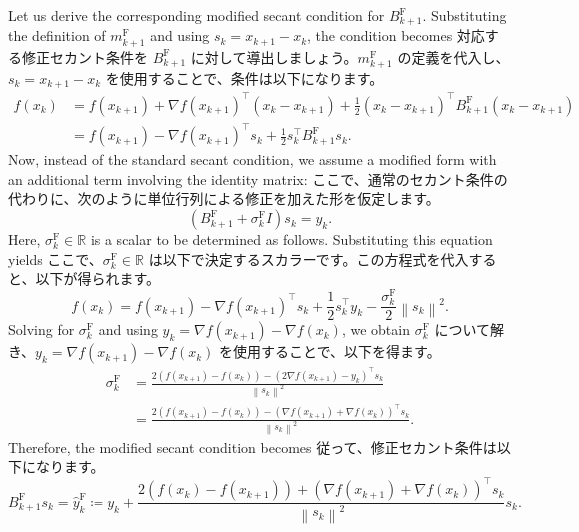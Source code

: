 \documentclass[0_main]{subfiles}
\begin{document}
\ifEn
    Let us derive the corresponding modified secant condition for $B_{k+1}^{\mathrm{F}}$. Substituting the definition of $m_{k+1}^{\mathrm{F}}$ and using $s_k = x_{k+1} - x_k$, the condition becomes
\else
    対応する修正セカント条件を $B_{k+1}^{\mathrm{F}}$ に対して導出しましょう。$m_{k+1}^{\mathrm{F}}$ の定義を代入し、$s_k = x_{k+1} - x_k$ を使用することで、条件は以下になります。
\fi
\begin{align*}
    f(x_k) & = f(x_{k+1}) + \nabla f(x_{k+1})^\top (x_k - x_{k+1}) + \frac{1}{2} (x_k - x_{k+1})^\top B_{k+1}^{\mathrm{F}} (x_k - x_{k+1}) \\
           & = f(x_{k+1}) - \nabla f(x_{k+1})^\top s_k + \frac{1}{2} s_k^\top B_{k+1}^{\mathrm{F}} s_k.
\end{align*}
\ifEn
    Now, instead of the standard secant condition, we assume a modified form with an additional term involving the identity matrix:
\else
    ここで、通常のセカント条件の代わりに、次のように単位行列による修正を加えた形を仮定します。
\fi
\begin{equation*}
    \left(B_{k+1}^{\mathrm{F}} + \sigma_k^\mathrm{F} I \right) s_k = y_k.
\end{equation*}
\ifEn
    Here, $\sigma_k^\mathrm{F} \in \mathbb{R}$ is a scalar to be determined as follows. Substituting this equation yields
\else
    ここで、$\sigma_k^\mathrm{F} \in \mathbb{R}$ は以下で決定するスカラーです。この方程式を代入すると、以下が得られます。
\fi
\begin{equation*}
    f(x_k) = f(x_{k+1}) - \nabla f(x_{k+1})^\top s_k + \frac{1}{2} s_k^\top y_k - \frac{\sigma_k^\mathrm{F}}{2} \left\lVert s_k \right\rVert^2.
\end{equation*}
\ifEn
    Solving for $\sigma_k^\mathrm{F}$ and using $y_k = \nabla f(x_{k+1}) - \nabla f(x_k)$, we obtain
\else
    $\sigma_k^\mathrm{F}$ について解き、$y_k = \nabla f(x_{k+1}) - \nabla f(x_k)$ を使用することで、以下を得ます。
\fi
\begin{align*}
    \sigma_k^\mathrm{F} & = \frac{2(f(x_{k+1}) - f(x_k)) - (2\nabla f(x_{k+1}) - y_k)^\top s_k}{\left\lVert s_k \right\rVert^2}           \\
                        & = \frac{2(f(x_{k+1}) - f(x_k)) - (\nabla f(x_{k+1}) + \nabla f(x_k))^\top s_k}{\left\lVert s_k \right\rVert^2}.
\end{align*}
\ifEn
    Therefore, the modified secant condition becomes
\else
    従って、修正セカント条件は以下になります。
\fi
\begin{equation*}
    B_{k+1}^{\mathrm{F}} s_k = \hat{y}^{\mathrm{F}}_k \coloneqq y_k + \frac{2(f(x_k) - f(x_{k+1})) + (\nabla f(x_{k+1}) + \nabla f(x_k))^\top s_k}{\left\lVert s_k \right\rVert^2} s_k.
\end{equation*}
\end{document}
